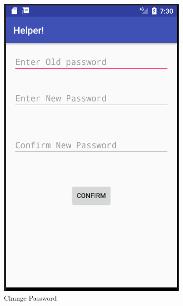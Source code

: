 			\begin{figure}[h!]
			\centering	
			\includegraphics[scale=0.8]{4.png} %
			\caption{Change Password}
			\label{fig:8} %
			
		\end{figure} 
		
		
		
		


